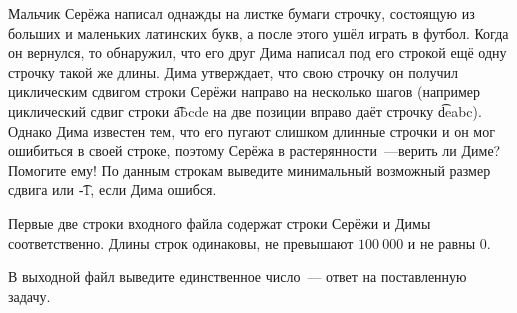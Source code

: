 Мальчик Серёжа написал однажды на листке бумаги строчку,
состоящую из больших и маленьких латинских букв, а после этого
ушёл играть в футбол. Когда он вернулся, то обнаружил, что его друг
Дима написал под его строкой ещё одну строчку такой же длины.
Дима утверждает, что свою строчку он получил циклическим сдвигом
строки Серёжи направо на несколько шагов (например циклический сдвиг
строки \t{abcde} на две позиции вправо даёт строчку \t{deabc}).
Однако Дима известен тем, что его пугают слишком длинные строчки и
он мог ошибиться в своей строке, поэтому Серёжа в растерянности~---верить ли
Диме? Помогите ему! По данным строкам выведите минимальный возможный
размер сдвига или \t{-1}, если Дима ошибся.

\InputFile

Первые две строки входного файла содержат строки Серёжи и Димы соответственно.
Длины строк одинаковы, не превышают $100\ 000$ и не равны $0$.

\OutputFile

В выходной файл выведите единственное число~--- ответ на поставленную задачу.

\SAMPLES

